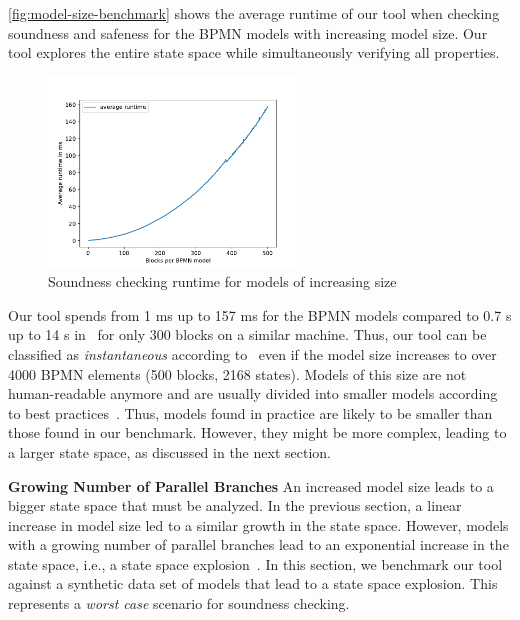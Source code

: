 \documentclass[runningheads]{llncs}
\newcommand{\subpart}[1]{\vspace{1em}\noindent\textbf{#1}}
\begin{document}
\autoref{fig:model-size-benchmark} shows the average runtime of our tool when checking soundness and safeness for the BPMN models with increasing model size.
Our tool explores the entire state space while simultaneously verifying all properties.

\begin{figure}[ht]
	\centering
	\includegraphics[width=0.6\textwidth]{images/model-size-benchmark}
	\caption{Soundness checking runtime for models of increasing size}
	\label{fig:model-size-benchmark}
\end{figure}

Our tool spends from 1 ms up to 157 ms for the BPMN models compared to 0.7 s up to 14 s in~\cite{krauterHigherorderTransformationApproach2023} for only 300 blocks on a similar machine.
Thus, our tool can be classified as \textit{instantaneous} according to~\cite{fahlandAnalysisDemandInstantaneous2011} even if the model size increases to over 4000 BPMN elements (500 blocks, 2168 states).
Models of this size are not human-readable anymore and are usually divided into smaller models according to best practices~\cite{fahlandAnalysisDemandInstantaneous2011}.
Thus, models found in practice are likely to be smaller than those found in our benchmark.
However, they might be more complex, leading to a larger state space, as discussed in the next section.

\subpart{Growing Number of Parallel Branches}
An increased model size leads to a bigger state space that must be analyzed.
In the previous section, a linear increase in model size led to a similar growth in the state space.
However, models with a growing number of parallel branches lead to an exponential increase in the state space, i.e., a state space explosion~\cite{clarkeHandbookModelChecking2018}.
In this section, we benchmark our tool against a synthetic data set of models that lead to a state space explosion.
This represents a \textit{worst case} scenario for soundness checking.
\end{document}
